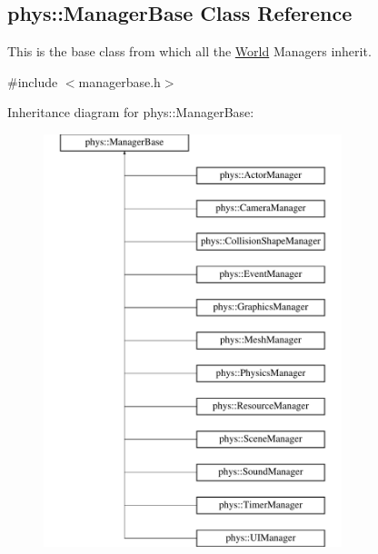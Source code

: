 \hypertarget{classphys_1_1ManagerBase}{
\subsection{phys::ManagerBase Class Reference}
\label{classphys_1_1ManagerBase}
}


This is the base class from which all the \hyperlink{classphys_1_1World}{World} Managers inherit.  




{\ttfamily \#include $<$managerbase.h$>$}

Inheritance diagram for phys::ManagerBase:\begin{figure}[H]
\begin{center}
\leavevmode
\includegraphics[height=12.000000cm]{classphys_1_1ManagerBase}
\end{center}
\end{figure}
